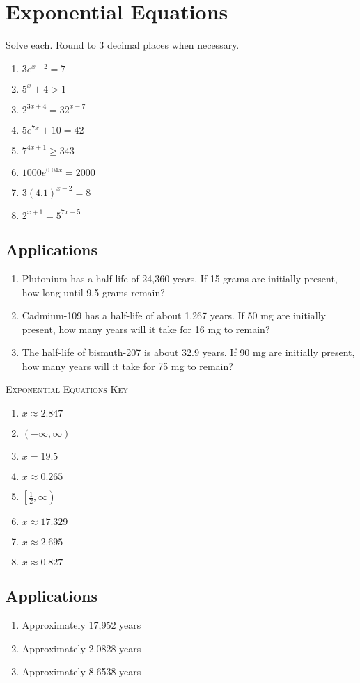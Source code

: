 \chapter{Exponential Equations}

Solve each. Round to 3 decimal places when necessary.
\begin{enumerate}
	\item $3e^{x-2} = 7$
	\item $5^x + 4 > 1$
	\item $2^{3x+4} = 32^{x-7}$
	\item $5e^{7x} + 10 = 42$
	\item $7^{4x+1} \geq 343$
	\item $1000e^{0.04x} = 2000$
	\item $3(4.1)^{x-2} = 8$
	\item $2^{x+1} = 5^{7x-5}$
\end{enumerate}

\section{Applications}
\begin{enumerate}
	\item Plutonium has a half-life of 24,360 years. If 15 grams are initially present, how long until 9.5 grams remain?
	\item Cadmium-109 has a half-life of about 1.267 years. If 50 mg are initially present, how many years will it take for 16 mg to remain?
    \item The half-life of bismuth-207 is about 32.9 years. If 90 mg are initially present, how many years will it take for 75 mg to remain?
\end{enumerate}

\newpage

\textsc{Exponential Equations Key}

\begin{enumerate}
	\item $x \approx 2.847$
	\item $(-\infty, \infty)$
	\item $x = 19.5$
	\item $x \approx 0.265$
	\item $\left[\frac{1}{2}, \infty\right)$
	\item $x \approx 17.329$
	\item $x \approx 2.695$
    \item $x \approx 0.827$
\end{enumerate}

\section*{Applications}

\begin{enumerate}
	\item Approximately 17,952 years
	\item Approximately 2.0828 years
    \item Approximately 8.6538 years
\end{enumerate}